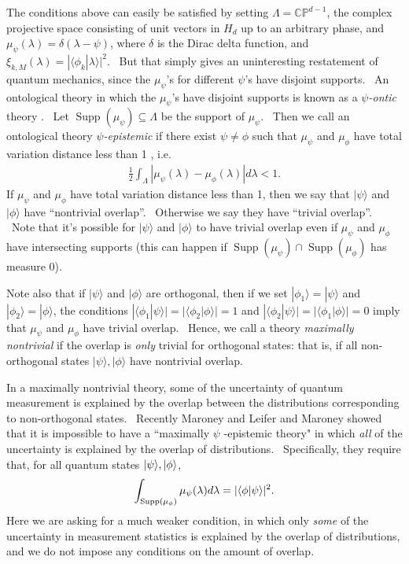 \documentclass[letterpaper,12pt]{article}
\newcommand{\ba}{\begin{eqnarray}}
\newcommand{\ea}{\end{eqnarray}}
\newcommand{\braket}[2]{\mbox{$ \langle #1 | #2 \rangle $}}
\newcommand{\ket}[1]{\mbox{$ | #1 \rangle $}}
\DeclareMathOperator{\supp}{Supp}
\begin{document}
The conditions above can easily be satisfied by setting $\Lambda = \mathbb{CP}^{d-1}$, the complex projective space consisting of unit vectors in $H_d$ up to an arbitrary phase, and $%
\mu_\psi(\lambda) = \delta(\lambda-\psi)$, where $\delta$ is the Dirac delta
function, and $\xi_{k,M}(\lambda) = | \langle \phi_k | \lambda
\rangle |^2$. \ But that simply gives an uninteresting restatement of
quantum mechanics, since the $\mu_{\psi}$'s for different $\psi$'s have disjoint supports. \ An ontological
theory in which the $\mu_{\psi}$'s have disjoint supports is known as a \textit{$\psi$-ontic} theory \cite{harriganspekkens}. \ Let $\supp(\mu_{\psi})\subseteq\Lambda$ be the
support of $\mu_{\psi}$. \ Then we call an ontological theory \textit{$\psi$-epistemic} if there exist $\psi\neq\phi$ such that $\mu_\psi$ and $\mu_\phi$
have total variation distance less than 1 \cite{harriganspekkens}, i.e.
\begin{eqnarray}
\frac{1}{2}\int_{\Lambda}\left|\mu_{\psi}(\lambda)-\mu_{\phi}(\lambda)%
\right| d\lambda < 1.
\end{eqnarray}
If $\mu_\psi$ and $\mu_\phi$ have total variation distance less than 1, then
we say that $ | \psi \rangle $ and $ | \phi \rangle $ have
``nontrivial overlap''. \ Otherwise we say they have ``trivial overlap''. \
Note that it's possible for $ | \psi \rangle $ and $ | \phi
\rangle $ to have trivial overlap even if $\mu_\psi$ and $\mu_\phi$ have
intersecting supports (this can happen if $\supp(\mu_{\psi})\cap \supp%
(\mu_{\phi})$ has measure $0$).

Note also that if $ | \psi \rangle $ and $ | \phi \rangle $
are orthogonal, then if we set $ | \phi_1 \rangle  =  | \psi
\rangle $ and $ | \phi_2 \rangle  = | \phi \rangle $,
the conditions $| \langle \phi_1 | \psi \rangle |=| \langle
\phi_2 | \phi \rangle |=1$ and $| \langle \phi_2 | \psi \rangle %
|=| \langle \phi_1 | \phi \rangle |=0$ imply that $\mu_\psi$ and $%
\mu_\phi$ have trivial overlap. \ Hence, we call a theory \textit{%
maximally nontrivial} if the overlap is \emph{only} trivial for orthogonal states: that is, if all non-orthogonal states $%
 | \psi \rangle, | \phi \rangle $ have nontrivial
overlap.

In a maximally nontrivial theory, some of the uncertainty of quantum
measurement is explained by the overlap between the distributions
corresponding to non-orthogonal states. \ Recently Maroney \cite{mar} and
Leifer and Maroney \cite{marleif} showed that it is impossible to have a ``maximally $\psi$%
-epistemic theory" in which \emph{all} of the uncertainty is explained by
the overlap of distributions. \ Specifically, they require that, for all quantum states $\ket{\psi}, \ket{\phi}$,
\ba \int_{\supp(\mu_{\phi})} \mu_{\psi}(\lambda) d\lambda = |\braket{\phi}{\psi}|^2.\ea
Here we are asking for a much weaker
condition, in which only \emph{some} of the uncertainty in measurement
statistics is explained by the overlap of distributions, and we do not impose any conditions on the amount of overlap.
\end{document}
